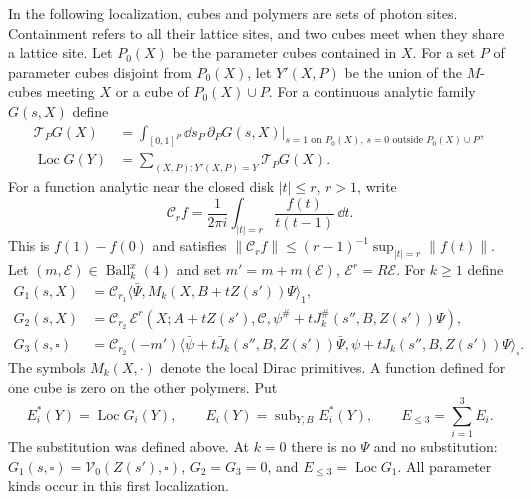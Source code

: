 In the following localization, cubes and polymers are sets
of photon sites. Containment refers to all their lattice sites,
and two cubes meet when they share a lattice site.
Let $P_0(X)$ be the parameter cubes contained in $X$.
For a set $P$ of parameter cubes disjoint from $P_0(X)$, let $Y'(X,P)$ be the union of
the $M$-cubes meeting $X$ or a cube of $P_0(X)\cup P$.
For a continuous analytic family $G(s,X)$ define
\begin{align}
 \mathcal T_PG(X)
  &=\int_{[0,1]^P}\dd s_P\,
       \partial_PG(s,X)
       \big|_{s=1\text{ on }P_0(X),\,
                    s=0\text{ outside }P_0(X)\cup P},
                          \label{eq:rgnl-interpolation}\\
 \operatorname{Loc}G(Y)
  &=\sum_{(X,P):Y'(X,P)=Y}\mathcal T_PG(X).
                          \label{eq:rgnl-localization}
\end{align}
For a function analytic near the closed disk $|t|\le r$, $r>1$,
write
\[
 \mathcal C_rf=\frac1{2\pi i}\int_{|t|=r}
                                      \frac{f(t)}{t(t-1)}\,\dd t .
\]
This is $f(1)-f(0)$ and satisfies
$\|\mathcal C_rf\|\le(r-1)^{-1}\sup_{|t|=r}\|f(t)\|$.
Let $(m,\mathscr E)\in\operatorname{Ball}_k^x(4)$ and set
$m'=m+m(\mathscr E)$, $\mathscr E^r=R\mathscr E$.
For $k\ge1$ define
\begin{align}
 G_1(s,X)&=\mathcal C_{r_1}
                \langle\bar\Psi,M_k(X,B+tZ(s'))\Psi\rangle_1,
                                      \label{eq:rgnl-G1}\\
 G_2(s,X)&=\mathcal C_{r_2}\,
       \mathscr E^r(X;A+tZ(s'),\mathscr C,
                    \psi^\#+tJ_k^\#(s'',B,Z(s'))\Psi),
                                      \label{eq:rgnl-G2}\\
 G_3(s,\square)&=\mathcal C_{r_2}(-m')
       \langle\bar\psi+t\bar J_k(s'',B,Z(s'))\bar\Psi,
                         \psi+tJ_k(s'',B,Z(s'))\Psi\rangle_\square .
                                      \label{eq:rgnl-G3}
\end{align}
The symbols $M_k(X,\cdot)$ denote the local Dirac primitives.
A function defined for one cube is zero on the other polymers.
Put
\[
 E_i^*(Y)=\operatorname{Loc}G_i(Y),\qquad
 E_i(Y)=\operatorname{sub}_{Y,B}E_i^*(Y),\qquad
 E_{\le3}=\sum_{i=1}^3E_i.
\]
The substitution was defined above.
At $k=0$ there is no $\Psi$ and no substitution:
$G_1(s,\square)=\mathcal V_0(Z(s'),\square)$,
$G_2=G_3=0$, and $E_{\le3}=\operatorname{Loc}G_1$.
All parameter kinds occur in this first localization.


